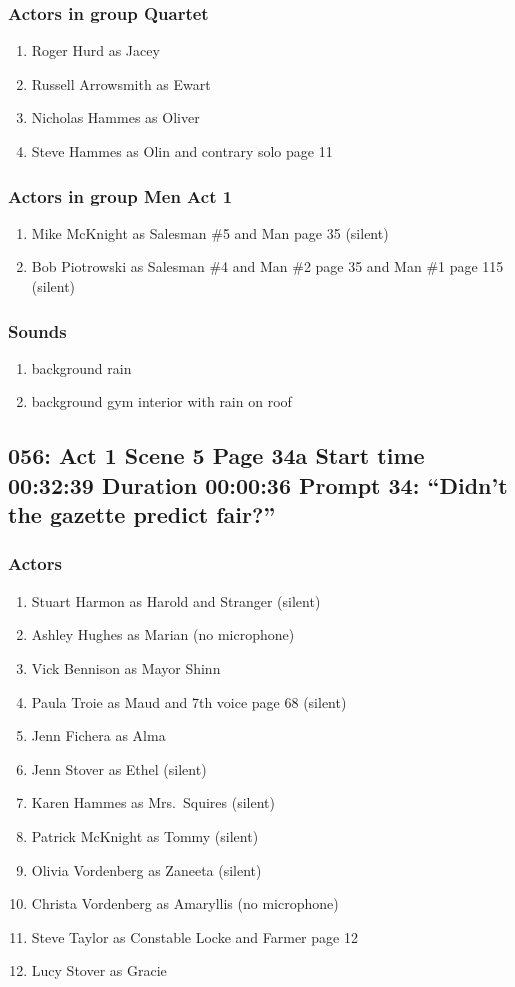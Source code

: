 \subsubsection{Actors in group Quartet}
\begin{enumerate}
\item Roger Hurd as Jacey
\item Russell Arrowsmith as Ewart
\item Nicholas Hammes as Oliver
\item Steve Hammes as Olin and contrary solo page 11
\end{enumerate}
\subsubsection{Actors in group Men Act 1}
\begin{enumerate}
\item Mike McKnight as Salesman \#5 and Man page 35 (silent)
\item Bob Piotrowski as Salesman \#4 and Man \#2 page 35 and Man \#1 page 115 (silent)
\end{enumerate}

\subsubsection{Sounds}
\begin{enumerate}
\item background rain
\item background gym interior with rain on roof
\end{enumerate}
\subsection{056: Act 1 Scene 5 Page 34a Start time 00:32:39 Duration 00:00:36 Prompt 34: ``Didn't the gazette predict fair?''}

\subsubsection{Actors}
\begin{enumerate}
\item Stuart Harmon as Harold and Stranger (silent)
\item Ashley Hughes as Marian (no microphone)
\item Vick Bennison as Mayor Shinn
\item Paula Troie as Maud and 7th voice page 68 (silent)
\item Jenn Fichera as Alma
\item Jenn Stover as Ethel (silent)
\item Karen Hammes as Mrs.~Squires (silent)
\item Patrick McKnight as Tommy (silent)
\item Olivia Vordenberg as Zaneeta (silent)
\item Christa Vordenberg as Amaryllis (no microphone)
\item Steve Taylor as Constable Locke and Farmer page 12
\item Lucy Stover as Gracie
\end{enumerate}
